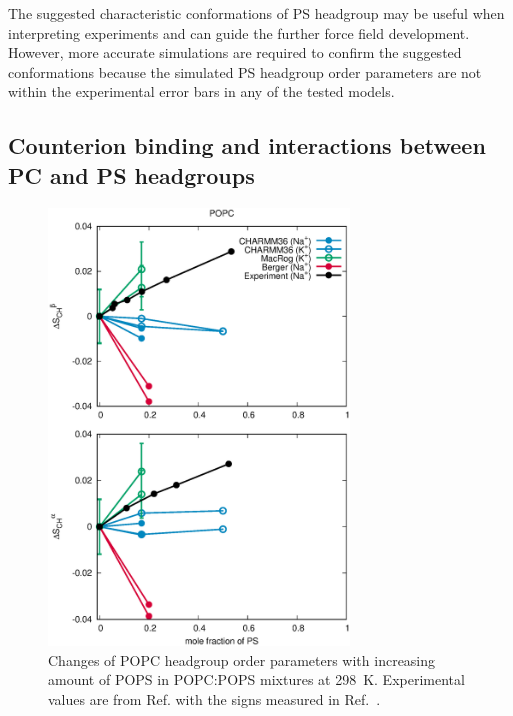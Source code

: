 \documentclass[aps,prl,superscriptaddress,twocolumn]{revtex4}
\begin{document}
The suggested characteristic conformations of PS headgroup may be useful when interpreting experiments and
can guide the further force field development. However, more accurate simulations are
required to confirm the suggested conformations because the simulated PS headgroup order parameters
are not within the experimental error bars in any of the tested models.


%



\subsection{Counterion binding and interactions between PC and PS headgroups}\label{ciBINDINGsection}


\begin{figure}[!tb]
  \centering
  \includegraphics[width=8.0cm]{../Figs/HGorderparametersPCvsPS.eps}
  \caption{\label{HGorderparametersPCvsPS}
    Changes of POPC headgroup order parameters with increasing amount of POPS in POPC:POPS mixtures at 298~K.
    Experimental values are from Ref.  with the signs measured in Ref.~.
  }
\end{figure}
\end{document}
